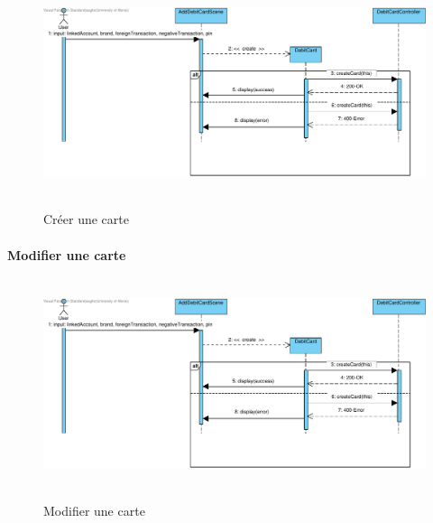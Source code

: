 \documentclass{article}
\begin{document}
\begin{figure}[h!]
    \hbox{
        \centering\includegraphics[width=\linewidth]{./img/sequence-client-Extension-1_create.pdf}
    }
    \caption{Créer une carte}
\end{figure}

\newpage

\paragraph{Modifier une carte}

\begin{figure}[h!]
    \hbox{
        \centering\includegraphics[width=\linewidth]{./img/sequence-client-Extension-1_create.pdf}
    }
    \caption{Modifier une carte}
\end{figure}
\end{document}
